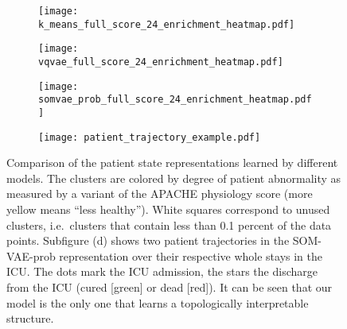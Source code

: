 \begin{figure}
\centering
\begin{subfigure}[t]{0.22\textwidth}
\centering
\texttt{[image: k\_means\_full\_score\_24\_enrichment\_heatmap.pdf]}
\end{subfigure}
\begin{subfigure}[t]{0.22\textwidth}
\centering
\texttt{[image: vqvae\_full\_score\_24\_enrichment\_heatmap.pdf]}
\end{subfigure}
\begin{subfigure}[t]{0.22\textwidth}
\centering
\texttt{[image: somvae\_prob\_full\_score\_24\_enrichment\_heatmap.pdf]}
\label{fig:ICU_representations}
\end{subfigure}
\begin{subfigure}[t]{0.22\textwidth}
\centering
\texttt{[image: patient\_trajectory\_example.pdf]}
\label{fig:patient_trajectories}
\end{subfigure}
\caption{Comparison of the patient state representations learned by different models. The clusters are colored by degree of patient abnormality as measured by a variant of the APACHE physiology score (more yellow means ``less healthy'').
White squares correspond to unused clusters, i.e.\ clusters that contain less than 0.1 percent of the data points.
Subfigure (d) shows two patient trajectories in the SOM-VAE-prob representation over their respective whole stays in the ICU.
The dots mark the ICU admission, the stars the discharge from the ICU (cured [green] or dead [red]).
It can be seen that our model is the only one that learns a topologically interpretable structure.
}
\label{fig:heatmaps}
\end{figure}


